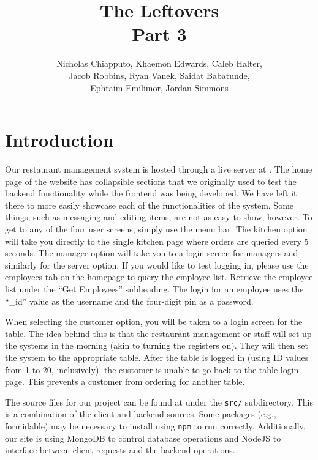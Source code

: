 \documentclass[11pt]{article}
\begin{document}
	\title{ \vspace{-1in}The Leftovers \\
			\Large{Part 3} }

	\author{	Nicholas Chiapputo, Khaemon Edwards, Caleb Halter, \\
				Jacob Robbins, Ryan Vanek, Saidat Babatunde, \\
				Ephraim Emilimor, Jordan Simmons
	}

	\maketitle

	\section{Introduction}
		Our restaurant management system is hosted through a live server at \cite{website}. The home page of the website has collapsible sections that we originally used to test the backend functionality while the frontend was being developed. We have left it there to more easily showcase each of the functionalities of the system. Some things, such as messaging and editing items, are not as easy to show, however. To get to any of the four user screens, simply use the menu bar. The kitchen option will take you directly to the single kitchen page where orders are queried every 5 seconds. The manager option will take you to a login screen for managers and similarly for the server option. If you would like to test logging in, please use the employees tab on the homepage to query the employee list. Retrieve the employee list under the ``Get Employees'' subheading. The login for an employee uses the ``\_id'' value as the username and the four-digit pin as a password. 

		When selecting the customer option, you will be taken to a login screen for the table. The idea behind this is that the restaurant management or staff will set up the systems in the morning (akin to turning the registers on). They will then set the system to the appropriate table. After the table is logged in (using ID values from 1 to 20, inclusively), the customer is unable to go back to the table login page. This prevents a customer from ordering for another table.

		The source files for our project can be found at \cite{repository} under the \texttt{src/} subdirectory. This is a combination of the client and backend sources. Some packages (e.g., formidable) may be necessary to install using \texttt{npm} to run correctly. Additionally, our site is using MongoDB to control database operations and NodeJS to interface between client requests and the backend operations. 
\end{document}
